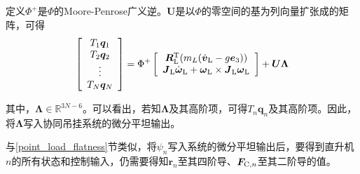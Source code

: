 定义$\Phi^{+}$是$\Phi$的Moore-Penrose广义逆。$\boldsymbol{U}$是以$\Phi$的零空间的基为列向量扩张成的矩阵，可得
\begin{equation}\label{T_each}
    \left[\begin{array}{c}
        T_1\boldsymbol{q}_1\\
        T_2\boldsymbol{q}_2\\
        \vdots\\
        T_N\boldsymbol{q}_N
    \end{array} 
    \right] = \Phi^{+}
        \left[\begin{array}{c}
            \boldsymbol{R}{\rm{_L^T}}(m_L(\dot{\boldsymbol{v}}{\rm{_L}}-g\boldsymbol{e}_3))\\
            \boldsymbol{J}{\rm{_L}}\dot{\boldsymbol{\omega}}{\rm{_L}} + \boldsymbol{\omega}{\rm{_L}} \times \boldsymbol{J}{\rm{_L}}\boldsymbol{\omega}{\rm{_L}}
        \end{array}
        \right]
     + \boldsymbol{U\Lambda}
\end{equation}

其中，$\boldsymbol{\Lambda} \in \mathbb{R}^{3N-6}$。可以看出，若知$\boldsymbol{\Lambda}$及其高阶项，可得$T_n\boldsymbol{q}_n$及其高阶项。因此，将$\boldsymbol{\Lambda}$写入协同吊挂系统的微分平坦输出。

与\ref{point_load_flatness}节类似，将$\psi_n$写入系统的微分平坦输出后，要得到直升机$n$的所有状态和控制输入，仍需要得知$\boldsymbol{r}_n$至其四阶导、$\boldsymbol{F}_{{\rm{C}},n}$至其二阶导的值。

